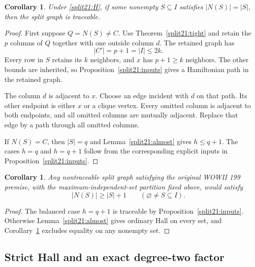 \documentclass[11pt,a4paper]{article}
\newtheorem{corollary}[theorem]{Corollary}
\theoremstyle{definition}\newtheorem{definition}[theorem]{Definition}
\theoremstyle{remark}\newtheorem{remark}[theorem]{Remark}
\begin{document}
\begin{corollary}\label{split21:tighttrace}
Under \eqref{split21:H}, if some nonempty $S\subseteq I$ satisfies
$|N(S)|=|S|$, then the split graph is traceable.
\end{corollary}
\begin{proof}
First suppose $Q=N(S)\ne C$. Use Theorem~\ref{split21:tight} and retain the $p$
columns of $Q$ together with one outside column $d$. The retained graph has
\[
 |C'|=p+1=|I|\leq2k.
\]
Every row in $S$ retains its $k$ neighbors, and $x$ has $p+1\geq k$
neighbors. The other bounds are inherited, so Proposition~\ref{split21:inputs}
gives a Hamiltonian path in the retained graph.

The column $d$ is adjacent to $x$. Choose an edge incident with $d$ on
that path. Its other endpoint is either $x$ or a clique vertex. Every
omitted column is adjacent to both endpoints, and all omitted columns
are mutually adjacent. Replace that edge by a path through all omitted
columns.

If $N(S)=C$, then $|S|=q$ and Lemma~\ref{split21:almost} gives $h\leq q+1$.
The cases $h=q$ and $h=q+1$ follow from the corresponding explicit inputs
in Proposition~\ref{split21:inputs}.
\end{proof}

\begin{corollary}\label{split21:strict}
Any nontraceable split graph satisfying the original WOWII 199 premise,
with the maximum-independent-set partition fixed above, would satisfy
\[
 |N(S)|\geq|S|+1\qquad(\varnothing\ne S\subseteq I).
\]
\end{corollary}
\begin{proof}
The balanced case $h=q+1$ is traceable by Proposition~\ref{split21:inputs}.
Otherwise Lemma~\ref{split21:almost} gives ordinary Hall on every set, and
Corollary~\ref{split21:tighttrace} excludes equality on any nonempty set.
\end{proof}

\subsection{Strict Hall and an exact degree-two factor}
\end{document}
